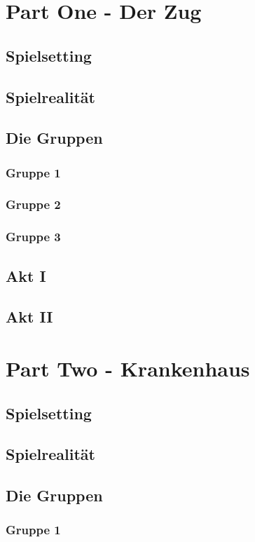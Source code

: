 \documentclass[12pt, a4paper, openany]{report}
\begin{document}
\chapter{Part One - Der Zug}
\section{Spielsetting}
\section{Spielrealität}
\section{Die Gruppen}
\subsection{Gruppe 1}
\subsection{Gruppe 2}
\subsection{Gruppe 3}
\section{Akt I}
\section{Akt II}

\chapter{Part Two - Krankenhaus}
\section{Spielsetting}
\section{Spielrealität}
\section{Die Gruppen}
\subsection{Gruppe 1}
\end{document}
